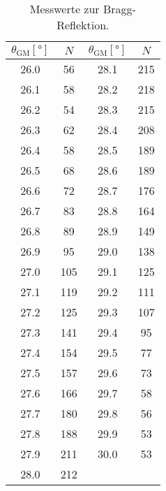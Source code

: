 \begin{table}[H]
    \centering
    \caption{Messwerte zur Bragg-Reflektion.}
    \begin{tabular}{S[table-format=2.1] c | S[table-format=2.1] c}
    \toprule
    {$\theta_\text{GM} [\si{\degree}]$} &
    {$N$} &
    {$\theta_\text{GM} [\si{\degree}]$} &
    {$N$} \\
    \midrule
    \num{26.0} & \num{56}  & \num{28.1} & \num{215} \\
    \num{26.1} & \num{58}  & \num{28.2} & \num{218} \\
    \num{26.2} & \num{54}  & \num{28.3} & \num{215} \\
    \num{26.3} & \num{62}  & \num{28.4} & \num{208} \\
    \num{26.4} & \num{58}  & \num{28.5} & \num{189} \\
    \num{26.5} & \num{68}  & \num{28.6} & \num{189} \\
    \num{26.6} & \num{72}  & \num{28.7} & \num{176} \\
    \num{26.7} & \num{83}  & \num{28.8} & \num{164} \\
    \num{26.8} & \num{89}  & \num{28.9} & \num{149} \\
    \num{26.9} & \num{95}  & \num{29.0} & \num{138} \\
    \num{27.0} & \num{105} & \num{29.1} & \num{125} \\
    \num{27.1} & \num{119} & \num{29.2} & \num{111} \\
    \num{27.2} & \num{125} & \num{29.3} & \num{107} \\
    \num{27.3} & \num{141} & \num{29.4} & \num{95}  \\
    \num{27.4} & \num{154} & \num{29.5} & \num{77}  \\
    \num{27.5} & \num{157} & \num{29.6} & \num{73}  \\
    \num{27.6} & \num{166} & \num{29.7} & \num{58}  \\
    \num{27.7} & \num{180} & \num{29.8} & \num{56}  \\
    \num{27.8} & \num{188} & \num{29.9} & \num{53}  \\
    \num{27.9} & \num{211} & \num{30.0} & \num{53}  \\
    \num{28.0} & \num{212} &            &           \\
    \bottomrule
    \end{tabular}
  \end{table}
  
